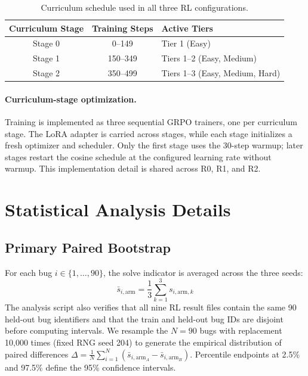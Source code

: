 \documentclass{article}
\begin{document}
\begin{table}[h]
\centering
\small
\begin{tabular}{c c l}
\toprule
\textbf{Curriculum Stage} & \textbf{Training Steps} & \textbf{Active Tiers} \\
\midrule
Stage 0 & 0--149 & Tier 1 (Easy) \\
Stage 1 & 150--349 & Tiers 1--2 (Easy, Medium) \\
Stage 2 & 350--499 & Tiers 1--3 (Easy, Medium, Hard) \\
\bottomrule
\end{tabular}
\caption{Curriculum schedule used in all three RL configurations.}
\label{tab:curriculum}
\end{table}

\paragraph{Curriculum-stage optimization.}
Training is implemented as three sequential GRPO trainers, one per curriculum stage. The LoRA adapter is carried across stages, while each stage initializes a fresh optimizer and scheduler. Only the first stage uses the 30-step warmup; later stages restart the cosine schedule at the configured learning rate without warmup. This implementation detail is shared across R0, R1, and R2.

\section{Statistical Analysis Details}
\label{app:stats}

\subsection{Primary Paired Bootstrap}
For each bug $i \in \{1, \dots, 90\}$, the solve indicator is averaged across the three seeds:
\begin{equation}
\bar{s}_{i,\text{arm}} = \frac{1}{3}\sum_{k=1}^{3} s_{i,\text{arm},k}
\end{equation}
The analysis script also verifies that all nine RL result files contain the same 90 held-out bug identifiers and that the train and held-out bug IDs are disjoint before computing intervals. We resample the $N=90$ bugs with replacement 10,000 times (fixed RNG seed 204) to generate the empirical distribution of paired differences $\Delta = \frac{1}{N}\sum_{i=1}^{N}(\bar{s}_{i,\text{arm}_A} - \bar{s}_{i,\text{arm}_B})$. Percentile endpoints at 2.5\% and 97.5\% define the 95\% confidence intervals.
\end{document}

